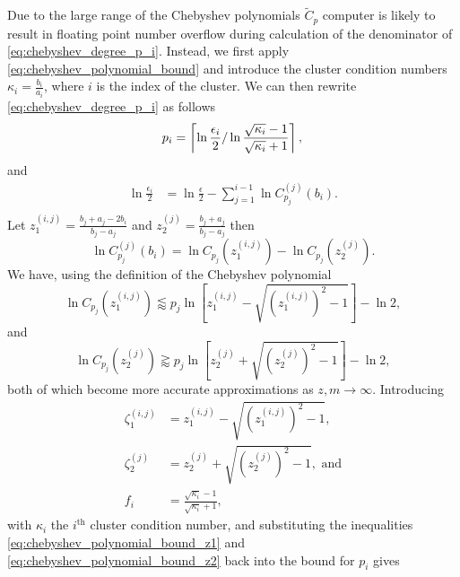 Due to the large range of the Chebyshev polynomials $\tilde{C}_p$ computer is likely to result in floating point number overflow during calculation of the denominator of \cref{eq:chebyshev_degree_p_i}. Instead, we first apply \cref{eq:chebyshev_polynomial_bound} and introduce the cluster condition numbers $\kappa_i = \frac{b_i}{a_i}$, where $i$ is the index of the cluster. We can then rewrite \cref{eq:chebyshev_degree_p_i} as follows
\begin{equation*}
    p_i  =  \left\lceil\ln{\frac{\epsilon_i}{2}} / \ln{\frac{\sqrt{\kappa_i} - 1}{\sqrt{\kappa_i} + 1}}\right\rceil, \\
\end{equation*}
and
\begin{align*}
    \ln{\frac{\epsilon_i}{2}} & = \ln{\frac{\epsilon}{2}} - \sum_{j=1}^{i-1} \ln{C^{(j)}_{p_j}(b_i)}. \\
\end{align*}
Let $z^{(i,j)}_1 = \frac{b_j + a_j - 2b_i}{b_j - a_j}$ and $z^{(j)}_2 = \frac{b_j + a_j}{b_j - a_j}$ then
\begin{equation*}
    \ln{C^{(j)}_{p_j}(b_i)} = \ln{C_{p_j}(z^{(i,j)}_1)} - \ln{C_{p_j}(z^{(j)}_2)}.
\end{equation*}
We have, using the definition of the Chebyshev polynomial
\begin{equation}
    \ln{C_{p_j}(z^{(i,j)}_1)} \lessapprox p_j \ln{\left[z^{(i,j)}_1 - \sqrt{\left(z^{(i,j)}_1\right)^2 - 1}\right]} - \ln{2},
    \label{eq:chebyshev_polynomial_bound_z1}
\end{equation}
and
\begin{equation}
    \ln{C_{p_j}(z^{(j)}_2)} \gtrapprox p_j \ln{\left[z^{(j)}_2 + \sqrt{\left(z^{(j)}_2\right)^2 - 1}\right]} - \ln{2},
    \label{eq:chebyshev_polynomial_bound_z2}
\end{equation}
both of which become more accurate approximations as $z,m\rightarrow\infty$. Introducing 
\begin{align*}
    \zeta^{(i,j)}_1 &= z^{(i,j)}_1 - \sqrt{\left(z^{(i,j)}_1\right)^2 - 1}, \\
    \zeta^{(j)}_2 &= z^{(j)}_2 + \sqrt{\left(z^{(j)}_2\right)^2 - 1}, \text{ and}\\
    f_i &= \frac{\sqrt{\kappa_i} - 1}{\sqrt{\kappa_i} + 1},
\end{align*}
with $\kappa_i$ the $i^{\text{th}}$ cluster condition number, and substituting the inequalities \ref{eq:chebyshev_polynomial_bound_z1} and \ref{eq:chebyshev_polynomial_bound_z2} back into the bound for $p_i$ gives
